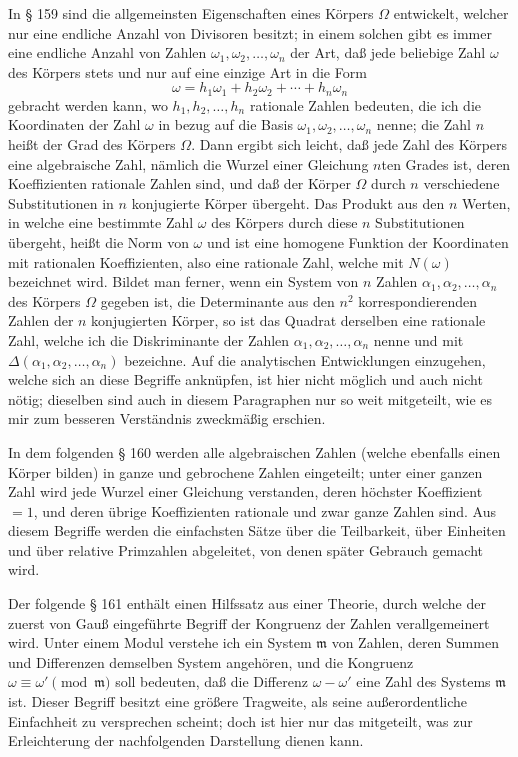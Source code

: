 \documentclass[11pt]{article}
\newcommand{\origpage}[1]{\par\vspace{0.25em}\noindent{\footnotesize\itshape [Gedruckte Seite #1]}\par\vspace{0.25em}}
\newcommand{\ideal}[1]{\mathfrak{#1}}
\begin{document}
In § 159 sind die allgemeinsten Eigenschaften eines Körpers $\Omega$ entwickelt, welcher nur eine endliche Anzahl von Divisoren besitzt; in einem solchen gibt es immer eine endliche Anzahl von Zahlen $\omega_1,\omega_2,\ldots,\omega_n$ der Art, daß jede beliebige Zahl $\omega$ des Körpers stets und nur auf eine einzige Art in die Form
\[
\omega=h_1\omega_1+h_2\omega_2+\cdots+h_n\omega_n
\]
gebracht werden kann, wo $h_1,h_2,\ldots,h_n$ rationale Zahlen bedeuten, die ich die Koordinaten der Zahl $\omega$ in bezug auf die Basis $\omega_1,\omega_2,\ldots,\omega_n$ nenne; die Zahl $n$ heißt der Grad des Körpers $\Omega$. Dann ergibt sich leicht, daß jede Zahl des Körpers eine algebraische Zahl, nämlich die Wurzel einer Gleichung $n$ten Grades ist, deren Koeffizienten rationale Zahlen sind, und daß der Körper $\Omega$ durch $n$ verschiedene Substitutionen in $n$ konjugierte Körper übergeht. Das Produkt aus den $n$ Werten, in welche eine bestimmte Zahl $\omega$ des Körpers durch diese $n$ Substitutionen übergeht, heißt die Norm von $\omega$ und ist eine homogene Funktion der Koordinaten mit rationalen Koeffizienten, also eine rationale Zahl, welche mit $N(\omega)$ bezeichnet wird. Bildet man ferner, wenn ein System von $n$ Zahlen $\alpha_1,\alpha_2,\ldots,\alpha_n$ des Körpers $\Omega$ gegeben ist, die Determinante aus den $n^2$ korrespondierenden Zahlen der $n$ konjugierten Körper, so ist das Quadrat derselben eine rationale Zahl, welche ich die Diskriminante der Zahlen $\alpha_1,\alpha_2,\ldots,\alpha_n$ nenne und mit $\Delta(\alpha_1,\alpha_2,\ldots,\alpha_n)$ bezeichne. Auf die analytischen Entwicklungen einzugehen, welche sich an diese Begriffe anknüpfen, ist hier nicht möglich und auch nicht nötig; dieselben sind auch in diesem Paragraphen nur so weit mitgeteilt, wie es mir zum besseren Verständnis zweckmäßig erschien.

\origpage{402}
In dem folgenden § 160 werden alle algebraischen Zahlen (welche ebenfalls einen Körper bilden) in ganze und gebrochene Zahlen eingeteilt; unter einer ganzen Zahl wird jede Wurzel einer Gleichung verstanden, deren höchster Koeffizient $=1$, und deren übrige Koeffizienten rationale und zwar ganze Zahlen sind. Aus diesem Begriffe werden die einfachsten Sätze über die Teilbarkeit, über Einheiten und über relative Primzahlen abgeleitet, von denen später Gebrauch gemacht wird.

Der folgende § 161 enthält einen Hilfssatz aus einer Theorie, durch welche der zuerst von Gauß eingeführte Begriff der Kongruenz der Zahlen verallgemeinert wird. Unter einem Modul verstehe ich ein System $\ideal{m}$ von Zahlen, deren Summen und Differenzen demselben System angehören, und die Kongruenz $\omega\equiv\omega'\pmod{\ideal{m}}$ soll bedeuten, daß die Differenz $\omega-\omega'$ eine Zahl des Systems $\ideal{m}$ ist. Dieser Begriff besitzt eine größere Tragweite, als seine außerordentliche Einfachheit zu versprechen scheint; doch ist hier nur das mitgeteilt, was zur Erleichterung der nachfolgenden Darstellung dienen kann.
\end{document}
